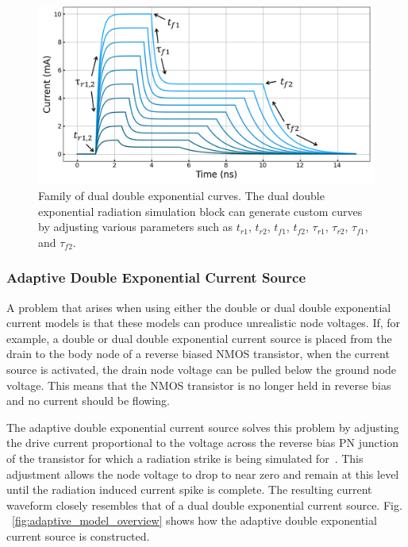 \documentclass[conference]{IEEEtran}
\begin{document}
    \begin{figure}[htbp]
        \centering
        \includegraphics[width=0.95\linewidth]{dual_double_exp_param_no_title}
        \caption{Family of dual double exponential curves. The dual double exponential radiation simulation block can generate custom curves by adjusting various parameters such as \(t_{r1}\), \(t_{r2}\), \(t_{f1}\), \(t_{f2}\), \(\tau_{r1}\), \(\tau_{r2}\), \(\tau_{f1}\), and \(\tau_{f2}\).}
        \label{fig:dual_double_exp}
    \end{figure}

    \subsubsection{Adaptive Double Exponential Current Source}
    A problem that arises when using either the double or dual double exponential current models is that these models can produce unrealistic node voltages.
    If, for example, a double or dual double exponential current source is placed from the drain to the body node of a reverse biased NMOS transistor, when the current source is activated, the drain node voltage can be pulled below the ground node voltage.
    This means that the NMOS transistor is no longer held in reverse bias and no current should be flowing.

    The adaptive double exponential current source solves this problem by adjusting the drive current proportional to the voltage across the reverse bias PN junction of the transistor for which a radiation strike is being simulated for~\cite{Kauppila2009}.
    This adjustment allows the node voltage to drop to near zero and remain at this level until the radiation induced current spike is complete.
    The resulting current waveform closely resembles that of a dual double exponential current source. Fig. ~\ref{fig:adaptive_model_overview} shows how the adaptive double exponential current source is constructed.
\end{document}
